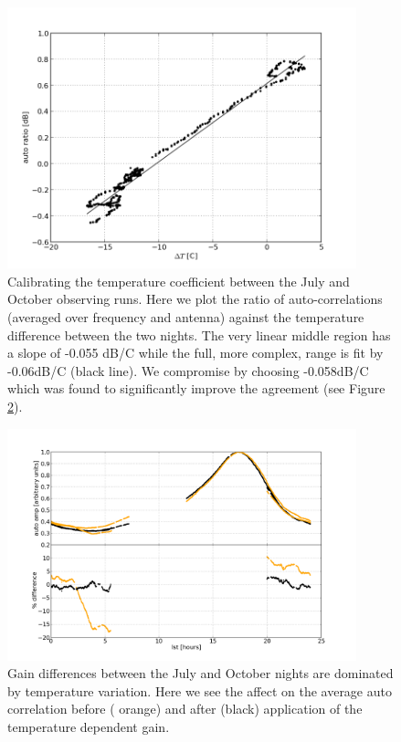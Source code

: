 \documentclass[preprint]{aastex}
\begin{document}
\begin{figure}
\includegraphics[width=0.9\textwidth]{plots/auto_tempcorr.png}
\caption{Calibrating the temperature coefficient  between the July and October observing runs.  Here we plot the ratio of auto-correlations (averaged over frequency and antenna) against the temperature difference between the two nights. The very linear middle region has a slope of  -0.055 dB/C while the full, more complex, range is fit by -0.06dB/C (black line).  We compromise by choosing -0.058dB/C   
which was found to significantly improve the agreement (see Figure \ref{fig:auto_compare}).
\label{fig:autos_tempcorr}}
\end{figure}

\begin{figure}
\includegraphics[width=0.9\textwidth]{plots/auto_balance.png}
\caption{Gain differences between the July and October nights are dominated by temperature variation. Here we see the affect on 
the average auto correlation before ({\color{orange} orange}) and after (black) application of the temperature dependent gain. \label{fig:auto_compare}}
\end{figure}
\end{document}
